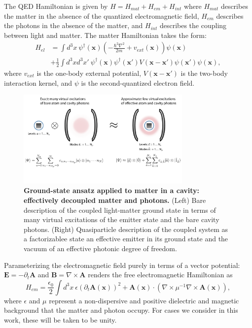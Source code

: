 \documentclass[aps,prl,twocolumn,
	groupedaddress,superscriptaddress,
	amsfonts,amssymb,amsmath,floatfix,
	citeautoscript]{revtex4-1}
\newcommand{\Jadd}[1]{\textcolor{blue}{#1}}
\begin{document}
The QED Hamiltonian is given by $H = H_{mat}+H_{em}+H_{int}$ where $H_{mat}$ describes the matter in the absence of the quantized electromagnetic field, $H_{em}$ describes the photons in the absence of the matter, and $H_{int}$ describes the coupling between light and matter. The matter Hamiltonian takes the form:
\begin{align}
H_{el} &= \int d^3x ~\psi^{\dagger}(\mathbf{x})\left(-\frac{\hbar^2\nabla^2}{2m} + v_{ext}(\mathbf{x}) \right)\psi(\mathbf{x}) \nonumber \\ &+ \frac{1}{2}\int d^3x d^3x'~ \psi^{\dagger}(\mathbf{x})\psi^{\dagger}(\mathbf{x}')V(\mathbf{x}-\mathbf{x}')\psi(\mathbf{x}')\psi(\mathbf{x}),
\end{align}
where $v_{ext}$ is the one-body external potential, $V(\mathbf{x}-\mathbf{x}')$ is the two-body interaction kernel, and $\psi$ is the second-quantized electron field. %
\begin{figure}[t]
\includegraphics[width=8.5cm]{conceptfigure.pdf}
\caption{\textbf{Ground-state ansatz applied to matter in a cavity: effectively decoupled matter and photons.} (Left) Bare description of the coupled light-matter ground state in terms of many virtual excitations of the emitter state and the bare cavity photons. (Right) Quasiparticle description of the coupled system as a factorizablee state an effective emitter in its ground state and the vacuum of an effective photonic degree of freedom.}
\label{fig:ansatz}
\end{figure}
Parameterizing the electromagnetic field purely in terms of a vector potential: $\mathbf{E} = -\partial_t\mathbf{A}$ and $\mathbf{B} = \nabla\times\mathbf{A}$ renders the free electromagnetic Hamiltonian as
\begin{equation}
H_{em} = \frac{\epsilon_0}{2}\int d^3x~ \epsilon (\partial_t \mathbf{A}(\mathbf{x}))^2 + \mathbf{A}(\mathbf{x})\cdot(\nabla\times\mu^{-1}\nabla\times\mathbf{A}(\mathbf{x})),
\end{equation}
where $\epsilon$ and $\mu$ represent a non-dispersive and positive dielectric and magnetic background that the matter and photon occupy. For cases we consider in this work, these will be taken to be unity.
\end{document}
